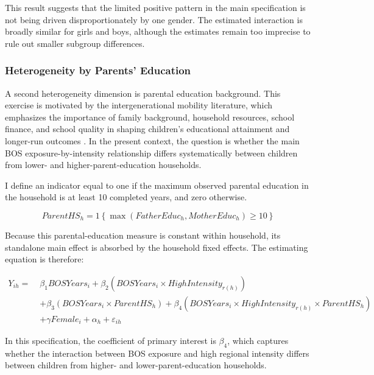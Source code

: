 \documentclass[a4paper, 12pt]{article}
\begin{document}
\begin{doublespacing}
This result suggests that the limited positive pattern in the main specification is not being driven disproportionately by one gender. The estimated interaction is broadly similar for girls and boys, although the estimates remain too imprecise to rule out smaller subgroup differences.

\subsubsection{Heterogeneity by Parents' Education}
A second heterogeneity dimension is parental education background. This exercise is motivated by the intergenerational mobility literature, which emphasizes the importance of family background, household resources, school finance, and school quality in shaping children's educational attainment and longer-run outcomes \citep{CholliDurlauf2022,AhsanEmranShilpi2024,Biasi2023}. In the present context, the question is whether the main BOS exposure-by-intensity relationship differs systematically between children from lower- and higher-parent-education households.

I define an indicator equal to one if the maximum observed parental education in the household is at least 10 completed years, and zero otherwise.

$$
ParentHS_{h} = 1\left\{\max(FatherEduc_{h}, MotherEduc_{h}) \geq 10\right\}
$$



Because this parental-education measure is constant within household, its standalone main effect is absorbed by the household fixed effects. The estimating equation is therefore:

\begin{equation}
\begin{aligned}
Y_{ih} =\;& \beta_{1} BOSYears_{i}
+ \beta_{2} \left(BOSYears_{i} \times HighIntensity_{r(h)}\right) \\
&+ \beta_{3} \left(BOSYears_{i} \times ParentHS_{h}\right)
+ \beta_{4} \left(BOSYears_{i} \times HighIntensity_{r(h)} \times ParentHS_{h}\right) \\
&+ \gamma Female_{i} + \alpha_{h} + \varepsilon_{ih}
\end{aligned}
\end{equation}

In this specification, the coefficient of primary interest is $\beta_{4}$, which captures whether the interaction between BOS exposure and high regional intensity differs between children from higher- and lower-parent-education households.


\end{doublespacing}
\end{document}
